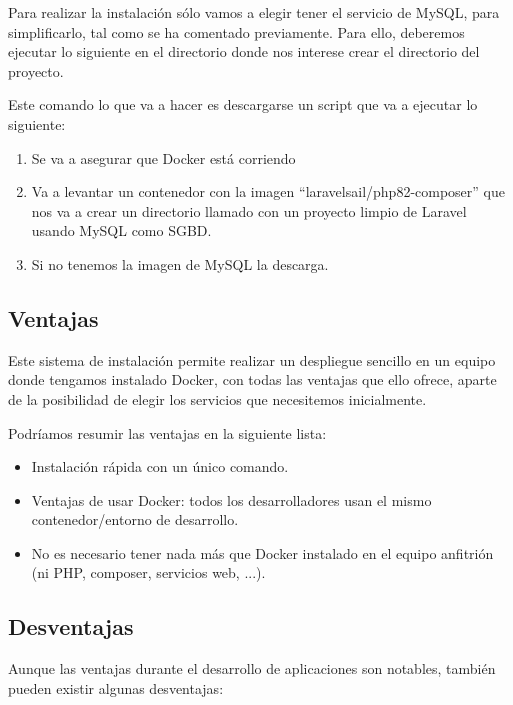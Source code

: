 Para realizar la instalación sólo vamos a elegir tener el servicio de MySQL, para simplificarlo, tal como se ha comentado previamente. Para ello, deberemos ejecutar lo siguiente en el directorio donde nos interese crear el directorio del proyecto.


Este comando lo que va a hacer es descargarse un script que va a ejecutar lo siguiente:
\begin{enumerate}
    \item Se va a asegurar que Docker está corriendo
    \item Va a levantar un contenedor con la imagen “laravelsail/php82-composer” que nos va a crear un directorio llamado  con un proyecto limpio de Laravel usando MySQL como SGBD.
    \item Si no tenemos la imagen de MySQL la descarga.
\end{enumerate}


\subsection{Ventajas}

Este sistema de instalación permite realizar un despliegue sencillo en un equipo donde tengamos instalado Docker, con todas las ventajas que ello ofrece, aparte de la posibilidad de elegir los servicios que necesitemos inicialmente.

Podríamos resumir las ventajas en la siguiente lista:

\begin{itemize}
    \item Instalación rápida con un único comando.
    \item Ventajas de usar Docker: todos los desarrolladores usan el mismo contenedor/entorno de desarrollo.
    \item No es necesario tener nada más que Docker instalado en el equipo anfitrión (ni PHP, composer, servicios web, ...).
\end{itemize}

\subsection{Desventajas}
Aunque las ventajas durante el desarrollo de aplicaciones son notables, también pueden existir algunas desventajas:

